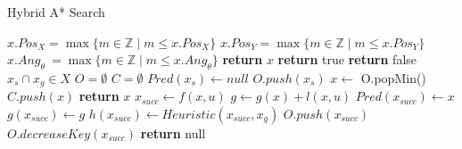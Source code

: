 \begin{algorithm}
    \caption{Hybrid A* Search}\label{alg:HA*}
    \begin{algorithmic}[1]
            \State $x.Pos_X = \max\{m\in\mathbb{Z}\mid m\le x.Pos_X\}$
            \State $x.Pos_Y = \max\{m\in\mathbb{Z}\mid m\le x.Pos_Y\}$
            \State $x.Ang_\theta\ =\max\{m\in\mathbb{Z}\mid m\le x.Ang_\theta\}$
            \State \textbf{return} $x$
        \EndFunction
        \Statex
                \State \textbf{return} true
            \Else
                \State \textbf{return} false
            \EndIf
        \EndFunction
        \Statex
        \Require $x_s \cap x_g \in X$
        \State $O = \emptyset$ \label{alg:HA*start}
        \State $C = \emptyset$
        \State $Pred(x_s) \gets null$
        \State $O.push(x_s)$
         \label{alg:HA*while}
            \State $x \gets$ O.popMin()
            \State $C.push(x)$
             \label{alg:HA*solution}
                \State \textbf{return} $x$
            \Else
                \State $x_{succ} \gets f(x,u)$\label{alg:HA*successor}
                        \State $g \gets g(x) + l(x,u)$
                            \State $Pred(x_{succ}) \gets x$
                            \State $g(x_{succ}) \gets g$
                            \State $h(x_{succ}) \gets Heuristic(x_{succ}, x_g)$
                                \State $O.push(x_{succ})$
                            \Else
                                \State $O.decreaseKey(x_{succ})$
                            \EndIf
                        \EndIf
                    \EndIf
                \EndFor
            \EndIf
        \EndWhile
        \State \textbf{return} null
    \end{algorithmic}
\end{algorithm}
